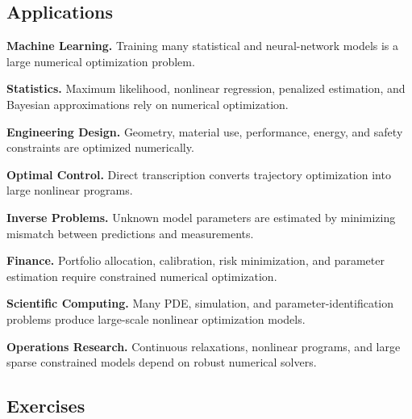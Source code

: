 \subsection{Applications}
\label{subsec:numerical-optimization-applications}

\begin{applicationbox}

\textbf{Machine Learning.}
Training many statistical and neural-network models is a large numerical
optimization problem.

\medskip

\textbf{Statistics.}
Maximum likelihood, nonlinear regression, penalized estimation, and
Bayesian approximations rely on numerical optimization.

\medskip

\textbf{Engineering Design.}
Geometry, material use, performance, energy, and safety constraints are
optimized numerically.

\medskip

\textbf{Optimal Control.}
Direct transcription converts trajectory optimization into large nonlinear
programs.

\medskip

\textbf{Inverse Problems.}
Unknown model parameters are estimated by minimizing mismatch between
predictions and measurements.

\medskip

\textbf{Finance.}
Portfolio allocation, calibration, risk minimization, and parameter
estimation require constrained numerical optimization.

\medskip

\textbf{Scientific Computing.}
Many PDE, simulation, and parameter-identification problems produce
large-scale nonlinear optimization models.

\medskip

\textbf{Operations Research.}
Continuous relaxations, nonlinear programs, and large sparse constrained
models depend on robust numerical solvers.

\end{applicationbox}

\subsection{Exercises}
\label{subsec:numerical-optimization-exercises}

